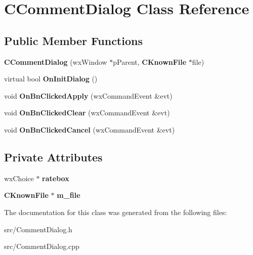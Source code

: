 \section{CCommentDialog Class Reference}
\label{classCCommentDialog}
\subsection*{Public Member Functions}
\begin{DoxyCompactItemize}
\item 
{\bfseries CCommentDialog} (wxWindow $\ast$pParent, {\bf CKnownFile} $\ast$file)\label{classCCommentDialog_ab669b8819231586dd3ce87a4f33576b6}

\item 
virtual bool {\bfseries OnInitDialog} ()\label{classCCommentDialog_ad5ac756038e2fcfb39335d3e6f4043e6}

\item 
void {\bfseries OnBnClickedApply} (wxCommandEvent \&evt)\label{classCCommentDialog_af9c251c94ffb8d9a20d6638980ffdd6a}

\item 
void {\bfseries OnBnClickedClear} (wxCommandEvent \&evt)\label{classCCommentDialog_a5f5683acab4b4d03f5b8cc6f065ff1a9}

\item 
void {\bfseries OnBnClickedCancel} (wxCommandEvent \&evt)\label{classCCommentDialog_ad11152811e9131918354478ce14a7d54}

\end{DoxyCompactItemize}
\subsection*{Private Attributes}
\begin{DoxyCompactItemize}
\item 
wxChoice $\ast$ {\bfseries ratebox}\label{classCCommentDialog_aac37a65850befe5e6f167e52e2221777}

\item 
{\bf CKnownFile} $\ast$ {\bfseries m\_\-file}\label{classCCommentDialog_a75c0d3559aa8df25a5e2aa404f93849c}

\end{DoxyCompactItemize}


The documentation for this class was generated from the following files:\begin{DoxyCompactItemize}
\item 
src/CommentDialog.h\item 
src/CommentDialog.cpp\end{DoxyCompactItemize}
